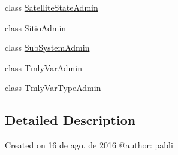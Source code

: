 \begin{DoxyCompactItemize}
\item 
class \hyperlink{class_ground_segment_1_1admin_1_1_satellite_state_admin}{Satellite\+State\+Admin}
\item 
class \hyperlink{class_ground_segment_1_1admin_1_1_sitio_admin}{Sitio\+Admin}
\item 
class \hyperlink{class_ground_segment_1_1admin_1_1_sub_system_admin}{Sub\+System\+Admin}
\item 
class \hyperlink{class_ground_segment_1_1admin_1_1_tmly_var_admin}{Tmly\+Var\+Admin}
\item 
class \hyperlink{class_ground_segment_1_1admin_1_1_tmly_var_type_admin}{Tmly\+Var\+Type\+Admin}
\end{DoxyCompactItemize}


\subsection{Detailed Description}
\begin{DoxyVerb}Created on 16 de ago. de 2016
@author: pabli
\end{DoxyVerb}
 